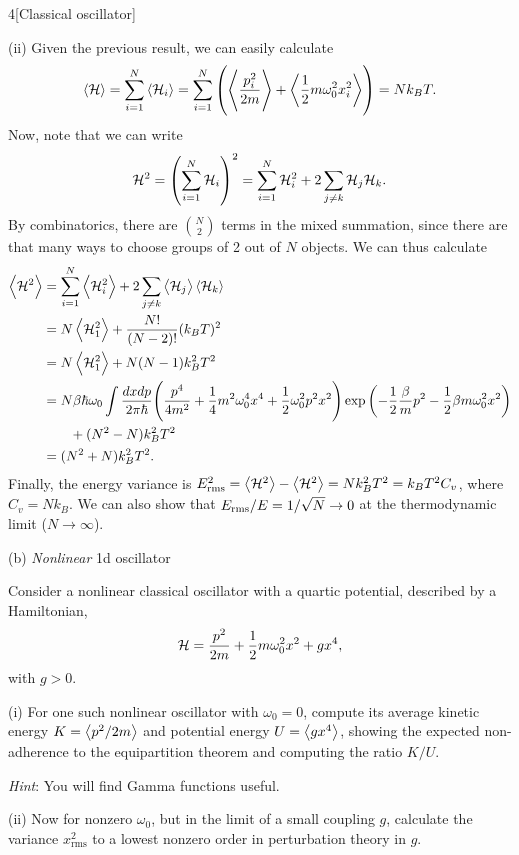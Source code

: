 \documentclass[12pt]{article}
\begin{document}
\begin{problem}{4}[Classical oscillator]
\begin{solution}
(ii) Given the previous result, we can easily calculate
\begin{align}
    \expval{\mathcal{H}}
    =\sum_{i=1}^N\expval{\mathcal{H}_i}
    =\sum_{i=1}^N\qty(\expval{\frac{p_i^2}{2m}}+\expval{\frac12
    m\omega_0^2x_i^2})
    =Nk_BT.
\end{align}
Now, note that we can write
\begin{equation}
    \mathcal{H}^2=\qty(\sum_{i=1}^N\mathcal{H}_i)^2
    =\sum_{i=1}^N\mathcal{H}_i^2+2\sum_{j\neq k}\mathcal{H}_j\mathcal{H}_k.
\end{equation}
By combinatorics, there are $\binom{N}{2}$ terms in the mixed summation, since
there are that many ways to choose groups of 2 out of $N$ objects. We can thus
calculate
\begin{align}
    \expval{\mathcal{H}^2}
    &=\sum_{i=1}^N\expval{\mathcal{H}_i^2}+2\sum_{j\neq k}\expval{\mathcal{H}_j}\expval{\mathcal{H}_k}
    \notag\\
    &=N\expval{\mathcal{H}_1^2}
    +\frac{N!}{(N-2)!}(k_BT)^2\notag\\
    &=N\expval{\mathcal{H}_1^2}+N(N-1)k_B^2T^2\notag\\
    &=N\beta\hbar\omega_0\int\frac{dxdp}{2\pi\hbar}\qty(\frac{p^4}{4m^2}+\frac14m^2\omega_0^4x^4+\frac12\omega_0^2p^2x^2)\exp\qty(-\frac12\frac\beta{m}p^2-\frac12\beta
    m\omega_0^2x^2)\notag\\
    &\qquad+(N^2-N)k_B^2T^2\notag\\
    &=(N^2+N)k_B^2T^2.
\end{align}
Finally, the energy variance is $E_{\text{rms}}^2=\expval{\mathcal{H}^2}-\expval{\mathcal{H}^2}
=Nk_B^2T^2=k_BT^2C_v$, where $C_v=Nk_B$. We can also show that
$E_{\text{rms}}/E=1/\sqrt{N}\to0$ at the thermodynamic limit ($N\to\infty$).
\end{solution}

(b) \textit{Nonlinear} 1d oscillator

Consider a nonlinear classical oscillator with a quartic potential, described by
a Hamiltonian,
\begin{equation}
    \mathcal{H}=\frac{p^2}{2m}+\frac12m\omega_0^2x^2+gx^4, 
\end{equation}
with $g>0$.

\qquad(i) For one such nonlinear oscillator with $\omega_0=0$, compute its
average kinetic energy $K=\expval{p^2/2m}$ and potential energy
$U=\expval{gx^4}$, showing the expected non-adherence to the equipartition
theorem and computing the ratio $K/U$.

\textit{Hint}: You will find Gamma functions useful.

\qquad(ii) Now for nonzero $\omega_0$, but in the limit of a small coupling $g$,
calculate the variance $x_\text{rms}^2$ to a lowest nonzero order in
perturbation theory in $g$.


\end{problem}
\end{document}
